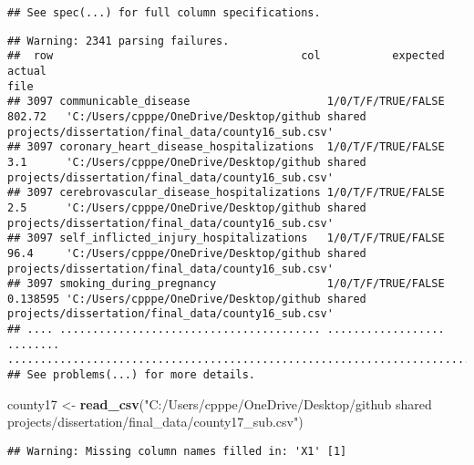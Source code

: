 \documentclass[
]{article}
\newenvironment{Shaded}{\begin{snugshade}}{\end{snugshade}}
\newcommand{\KeywordTok}[1]{\textcolor[rgb]{0.13,0.29,0.53}{\textbf{#1}}}
\newcommand{\NormalTok}[1]{#1}
\newcommand{\StringTok}[1]{\textcolor[rgb]{0.31,0.60,0.02}{#1}}
\begin{document}
\begin{verbatim}
## See spec(...) for full column specifications.
\end{verbatim}

\begin{verbatim}
## Warning: 2341 parsing failures.
##  row                                      col           expected   actual                                                                                              file
## 3097 communicable_disease                     1/0/T/F/TRUE/FALSE 802.72   'C:/Users/cpppe/OneDrive/Desktop/github shared projects/dissertation/final_data/county16_sub.csv'
## 3097 coronary_heart_disease_hospitalizations  1/0/T/F/TRUE/FALSE 3.1      'C:/Users/cpppe/OneDrive/Desktop/github shared projects/dissertation/final_data/county16_sub.csv'
## 3097 cerebrovascular_disease_hospitalizations 1/0/T/F/TRUE/FALSE 2.5      'C:/Users/cpppe/OneDrive/Desktop/github shared projects/dissertation/final_data/county16_sub.csv'
## 3097 self_inflicted_injury_hospitalizations   1/0/T/F/TRUE/FALSE 96.4     'C:/Users/cpppe/OneDrive/Desktop/github shared projects/dissertation/final_data/county16_sub.csv'
## 3097 smoking_during_pregnancy                 1/0/T/F/TRUE/FALSE 0.138595 'C:/Users/cpppe/OneDrive/Desktop/github shared projects/dissertation/final_data/county16_sub.csv'
## .... ........................................ .................. ........ .................................................................................................
## See problems(...) for more details.
\end{verbatim}

\begin{Shaded}
\begin{Highlighting}[]
\NormalTok{county17 <-}\StringTok{ }\KeywordTok{read_csv}\NormalTok{(}\StringTok{"C:/Users/cpppe/OneDrive/Desktop/github shared projects/dissertation/final_data/county17_sub.csv"}\NormalTok{)}
\end{Highlighting}
\end{Shaded}

\begin{verbatim}
## Warning: Missing column names filled in: 'X1' [1]
\end{verbatim}
\end{document}
